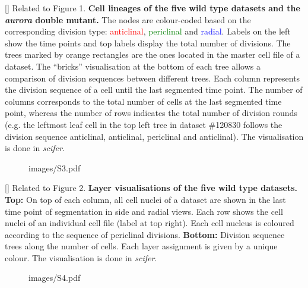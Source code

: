 []{
Related to Figure 1.
{\bf Cell lineages of the five wild type datasets and the \emph{aurora} double mutant.} The nodes are colour-coded based on the corresponding division type: \textcolor{red}{anticlinal}, \textcolor{green}{periclinal} and \textcolor{blue}{radial}. Labels on the left show the time points and top labels display the total number of divisions. The trees marked by orange rectangles are the ones located in the master cell file of a dataset. The ``bricks'' visualisation at the bottom of each tree allows a comparison of division sequences between different trees. Each column represents the division sequence of a cell until the last segmented time point. The number of columns corresponds to the total number of cells at the last segmented time point, whereas the number of rows indicates the total number of division rounds (e.g. the leftmost leaf cell in the top left tree in dataset \#120830 follows the division sequence anticlinal, anticlinal, periclinal and anticlinal). The visualisation is done in \textit{scifer}.
}
\label{fig:S2}
%
\clearpage
%
\begin{figure}[htbp]
\centering
	\begin{overpic}[width=1.\linewidth]{images/S3.pdf}
	\end{overpic}
\end{figure}
\clearpage
{}[]{
Related to Figure 2.
{\bf Layer visualisations of the five wild type datasets.} {\bf Top:} On top of each column, all cell nuclei of a dataset are shown in the last time point of segmentation in side and radial views. Each row shows the cell nuclei of an individual cell file (label at top right). Each cell nucleus is coloured according to the sequence of periclinal divisions. {\bf Bottom:} Division sequence trees along the number of cells. Each layer assignment is given by a unique colour. The visualisation is done in \textit{scifer}.
}
\label{fig:S3}
%
\clearpage
%
\begin{figure}[htbp]
\centering
	\begin{overpic}[width=1.\linewidth]{images/S4.pdf}
	\end{overpic}
\end{figure}
\clearpage
